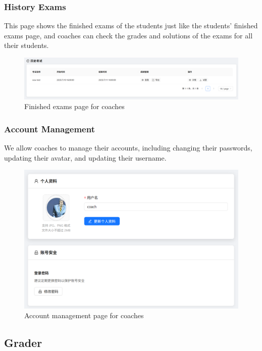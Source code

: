 \documentclass[12pt]{article}
\begin{document}
\subsubsection{History Exams}
This page shows the finished exams of the students just like the students' finished exams page, and coaches can check the grades and solutions of the exams
for all their students.
\begin{figure}[H]
    \centering
    \includegraphics[width=\textwidth]{coach/test-ed.png}
    \caption{Finished exams page for coaches}
    \label{fig:FinishedExamsForCoach page}
\end{figure}
\subsubsection{Account Management}
We allow coaches to manage their accounts, including changing their passwords, updating their avatar, and updating their username.
\begin{figure}[H]
    \centering
    \includegraphics[width=\textwidth]{coach/account.png}
    \caption{Account management page for coaches}
    \label{fig:AccountManagementForCoach page}
\end{figure}
\subsection{Grader}
\end{document}
